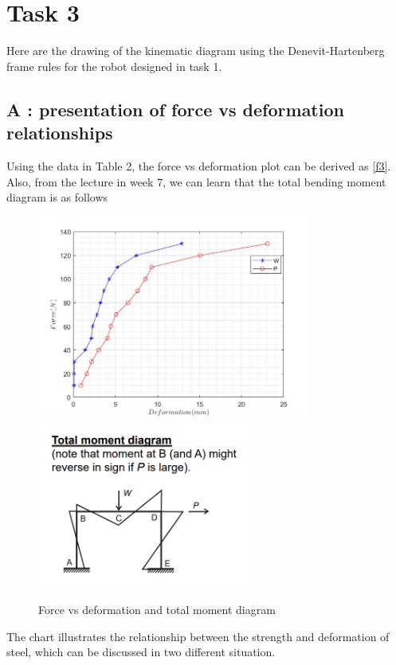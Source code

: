 \section{Task 3}
\FloatBarrier %

Here are the drawing of the kinematic diagram using the Denevit-Hartenberg frame rules for the robot designed in task 1.




\iffalse
\subsection*{A : presentation of force vs deformation relationships}
Using the data in Table 2, the force vs deformation plot can be derived as \autoref{f3}. Also, from the lecture in week 7, we can learn that the total bending moment diagram is as follows


\begin{figure}[htbp]
    \centering
    \includegraphics[width=9cm]{./fig/17.jpg}
    \includegraphics[width=7cm]{./fig/16.png}
    \caption{Force vs deformation and total moment diagram}
    \label{f4}
\end{figure}


The chart illustrates the relationship between the strength and deformation of steel, which can be discussed in two different situation.

